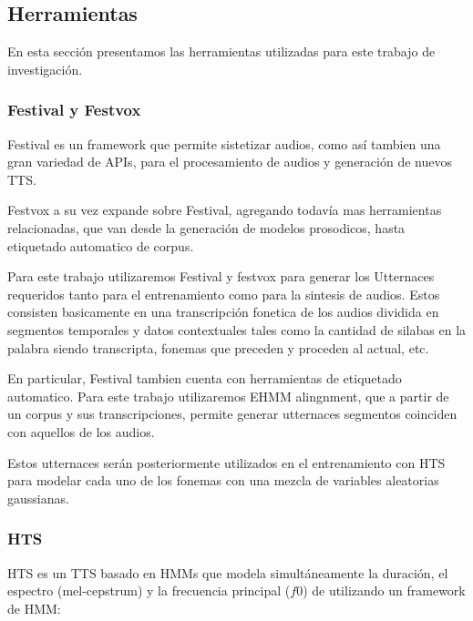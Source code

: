 \subsection{Herramientas}

En esta sección presentamos las herramientas utilizadas para este trabajo de investigación.

\subsubsection{Festival y Festvox}

Festival es un framework que permite sistetizar audios, como así tambien una gran variedad de APIs, para el procesamiento de audios y generación de nuevos TTS.

Festvox a su vez expande sobre Festival, agregando todavía mas herramientas relacionadas, que van desde la generación de modelos prosodicos, hasta etiquetado automatico de corpus.

Para este trabajo utilizaremos Festival y festvox para generar los Utternaces requeridos tanto para el entrenamiento como para la sintesis de audios. Estos consisten basicamente en una transcripción fonetica de los audios dividida en segmentos temporales y datos contextuales tales como la cantidad de silabas en la palabra siendo transcripta, fonemas que preceden y proceden al actual, etc.

En particular, Festival tambien cuenta con herramientas de etiquetado automatico. Para este trabajo utilizaremos EHMM alingnment, que a partir de un corpus y sus transcripciones, permite generar utternaces segmentos coinciden con aquellos de los audios.

Estos utternaces serán posteriormente utilizados en el entrenamiento con HTS para modelar cada uno de los fonemas con una mezcla de variables aleatorias gaussianas.

\subsubsection{HTS}

HTS es un TTS basado en HMMs que modela simultáneamente la duración, el espectro (mel-cepstrum) y la frecuencia principal ($f0$) de utilizando un framework de HMM:

